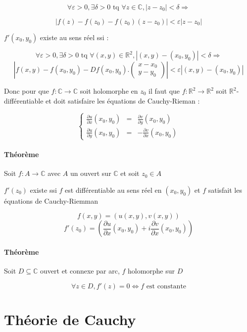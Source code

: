 \documentclass[a4paper,10pt]{report}
\newcommand{\ap}{\rightarrow}
\newcommand{\R}{\mathbb{R}}
\newcommand{\C}{\mathbb{C}}
\newcommand{\so}{\Rightarrow}
\newcommand{\ioi}{\Leftrightarrow}
\newcommand{\abs}[1]{\left\vert #1 \right\vert}
\begin{document}
\[\forall \varepsilon > 0, \exists \delta > 0 \mbox{ tq } \forall z \in \C, \abs{z - z_0} < \delta \so \]

\[\abs{f(z) - f(z_0) - f(z_0)(z-z_0)} < \varepsilon \abs{z - z_0} \]

$f'(x_0,y_0)$ existe au sens réel ssi :

\[\forall \varepsilon > 0, \exists \delta > 0 \mbox{ tq } \forall (x,y) \in \R^2, \abs{(x,y) - (x_0,y_0)} < \delta \so \]
\[\abs{ f(x,y) - f(x_0,y_0) - Df(x_0,y_0).\left( \begin{array}{c} x - x_0 \\ y - y_0 \end{array} \right) } < \varepsilon \abs{(x,y) - (x_0,y_0)} \]

Donc pour que $f : \C \ap \C$ soit holomorphe en $z_0$ il faut que $f: \R^2 \ap \R^2$ soit $\R^2$-différentiable et doit satisfaire les équations de Cauchy-Rieman :

\[\left\{ \begin{array}{ccc}
\frac{\partial u}{\partial x}(x_0,y_0) & = & \frac{\partial v}{\partial y} (x_0,y_0) \\
\frac{\partial u}{\partial y}(x_0,y_0) & = & - \frac{\partial v}{\partial x} (x_0,y_0)
\end{array} \right. \]

\subsubsection{Théorème}

Soit $f : A \ap \C$ avec $A$ un ouvert sur $\C$ et soit $z_0 \in A$

$f'(z_0)$ existe ssi $f$ est différentiable au sens réel en $(x_0, y_0)$ et $f$ satisfait les équations de Cauchy-Riemman

\[f(x,y) = (u(x,y),v(x,y))\]
\[f'(z_0) = \left( \frac{\partial u}{\partial x} (x_0,y_0) + i \frac{\partial v}{\partial x} (x_0,y_0)\right) \]

\subsubsection{Théorème}

Soit $D \subseteq \C$ ouvert et connexe par arc, $f$ holomorphe sur $D$

\[\forall z \in D, f'(z) = 0 \ioi f \mbox{ est constante} \]

\chapter{Théorie de Cauchy}
\end{document}

